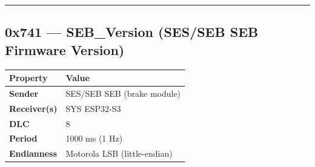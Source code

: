 \begin{center}\rule{0.5\linewidth}{0.5pt}\end{center}

\subsection{0x741 --- SEB\_Version (SES/SEB SEB Firmware
Version)}\label{x741-seb_version-SES/SEB-seb-firmware-version}

\begin{longtable}[]{@{}ll@{}}
\toprule\noalign{}
Property & Value \\
\midrule\noalign{}
\endhead
\bottomrule\noalign{}
\endlastfoot
\textbf{Sender} & SES/SEB SEB (brake module) \\
\textbf{Receiver(s)} & SYS ESP32-S3 \\
\textbf{DLC} & 8 \\
\textbf{Period} & 1000 ms (1 Hz) \\
\textbf{Endianness} & Motorola LSB (little-endian) \\
\end{longtable}

